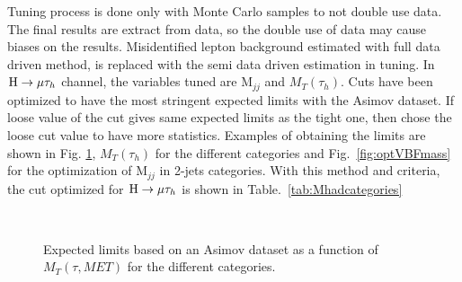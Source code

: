 Tuning process is done only with Monte Carlo samples to not double use data. The final results are extract from data, so the double use of data may cause biases on the results. Misidentified lepton background estimated with full data driven method, is replaced with the semi data driven estimation in tuning. In $\mathrm{H}\to \mu\tau_{h}$  channel, the variables tuned are $\textrm{M}_{jj}$ and $M_{T}(\tau_{h})$. Cuts have been optimized to have the most stringent expected limits with the Asimov dataset. If loose value of the cut gives same expected limits as the tight one, then chose the loose cut value to have more statistics. Examples of obtaining the limits are shown in Fig. \ref{fig:optMT}, $M_T(\tau_{h})$ for the different categories and Fig.~\ref{fig:optVBFmass}  for the optimization of $\textrm{M}_{jj}$ in 2-jets categories. With this method and criteria, the cut optimized for $\mathrm{H}\to \mu\tau_{h}$ is shown in Table.~\ref{tab:Mhadcategories}


\begin{figure}[htbp] 
     \centering
     \\
     \caption{Expected limits based on an Asimov dataset as a function of $M_T(\tau, MET)$ for the different categories.}
     \label{fig:optMT}
\end{figure}

